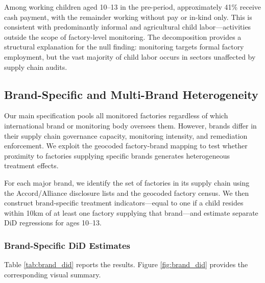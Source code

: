 \documentclass[12pt]{article}
\begin{document}


Among working children aged 10--13 in the pre-period, approximately 41\% receive cash payment, with the remainder working without pay or in-kind only. This is consistent with predominantly informal and agricultural child labor---activities outside the scope of factory-level monitoring. The decomposition provides a structural explanation for the null finding: monitoring targets formal factory employment, but the vast majority of child labor occurs in sectors unaffected by supply chain audits.


\subsection{Brand-Specific and Multi-Brand Heterogeneity}

Our main specification pools all monitored factories regardless of which international brand or monitoring body oversees them. However, brands differ in their supply chain governance capacity, monitoring intensity, and remediation enforcement. We exploit the geocoded factory-brand mapping to test whether proximity to factories supplying specific brands generates heterogeneous treatment effects.

For each major brand, we identify the set of factories in its supply chain using the Accord/Alliance disclosure lists and the geocoded factory census. We then construct brand-specific treatment indicators---equal to one if a child resides within 10km of at least one factory supplying that brand---and estimate separate DiD regressions for ages 10--13.

\subsubsection{Brand-Specific DiD Estimates}

Table \ref{tab:brand_did} reports the results. Figure \ref{fig:brand_did} provides the corresponding visual summary.
\end{document}
